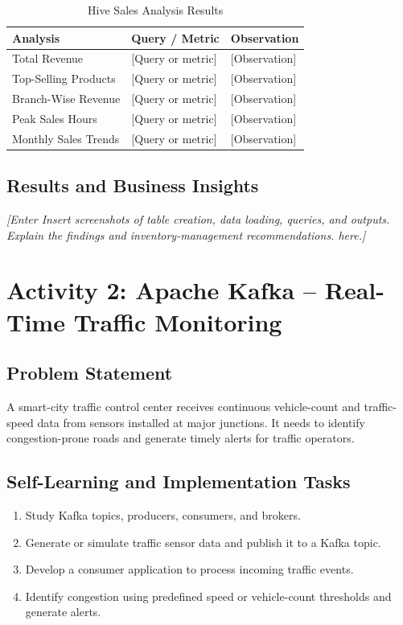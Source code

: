 \documentclass[12pt,a4paper]{report}
\newcommand{\placeholder}[1]{\textit{[Enter #1 here.]}}
\newcommand{\activityheading}[2]{%
  \section{Activity #1: #2}%
}
\begin{document}
\begin{table}[H]
\centering
\caption{Hive Sales Analysis Results}
\begin{tabularx}{\textwidth}{|X|X|X|}
\hline
\textbf{Analysis} & \textbf{Query / Metric} & \textbf{Observation}\\
\hline
Total Revenue & [Query or metric] & [Observation]\\
\hline
Top-Selling Products & [Query or metric] & [Observation]\\
\hline
Branch-Wise Revenue & [Query or metric] & [Observation]\\
\hline
Peak Sales Hours & [Query or metric] & [Observation]\\
\hline
Monthly Sales Trends & [Query or metric] & [Observation]\\
\hline
\end{tabularx}
\end{table}

\subsection{Results and Business Insights}
\placeholder{Insert screenshots of table creation, data loading, queries,
and outputs. Explain the findings and inventory-management recommendations.}

\clearpage
\activityheading{2}{Apache Kafka -- Real-Time Traffic Monitoring}

\subsection{Problem Statement}
A smart-city traffic control center receives continuous vehicle-count
and traffic-speed data from sensors installed at major junctions. It
needs to identify congestion-prone roads and generate timely alerts for
traffic operators.

\subsection{Self-Learning and Implementation Tasks}
\begin{enumerate}
    \item Study Kafka topics, producers, consumers, and brokers.
    \item Generate or simulate traffic sensor data and publish it to a Kafka topic.
    \item Develop a consumer application to process incoming traffic events.
    \item Identify congestion using predefined speed or vehicle-count thresholds
    and generate alerts.
\end{enumerate}
\end{document}
